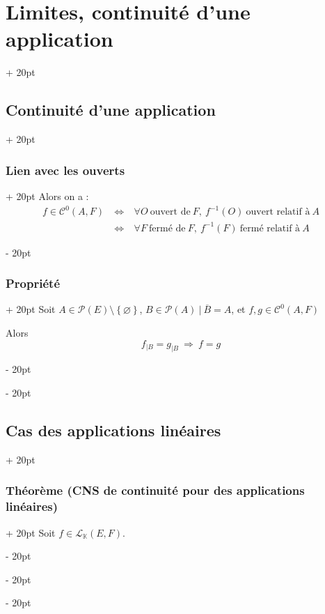 \documentclass[a4paper, 12pt, twoside]{article}
\newcommand{\K}{\mathbb K}
\newcommand{\cj}[1]{\overline{#1}} %
\newcommand{\set}[1]{\left\{ #1 \right\}}
\newcommand{\ssi}{\ \Leftrightarrow \ }
\newcommand{\ind}[1][20pt]{\advance\leftskip + #1}
\newcommand{\deind}[1][20pt]{\advance\leftskip - #1}
\newenvironment{indt}[2][20pt]{#2 \par \ind[#1]}{\par \deind} %
\begin{document}
\begin{indt}{\section{Limites, continuité d'une application}}
\begin{indt}{\subsection{Continuité d'une application}}
\begin{indt}{\subsubsection{Lien avec les ouverts}}
                Alors on a :
                \[
                    \begin{array}{rcl}
                        f \in \mathcal C^0(A, F)
                        &\ssi&
                        \forall O\ \text{ouvert de}\ F,\
                        f^{-1}(O)\ \text{ouvert relatif à}\ A
                        \\
                        &\ssi&
                        \forall F\ \text{fermé de}\ F,\
                        f^{-1}(F)\ \text{fermé relatif à}\ A
                    \end{array}
                \]
            \end{indt}

            \vspace{12pt}
            
            \begin{indt}{\subsubsection{Propriété}}
                Soit $A \in \mathcal P(E) \setminus \set \varnothing$, $B \in \mathcal P(A)\ |\ \cj B = A$, et $f, g \in \mathcal C^0(A, F)$

                Alors
                \[
                    f_{|B} = g_{|B}\
                    \Rightarrow\
                    f = g
                \]
            \end{indt}
        \end{indt}

        \vspace{12pt}
        
        \begin{indt}{\subsection{Cas des applications linéaires}}
            \begin{indt}{\subsubsection{Théorème (CNS de continuité pour des applications linéaires)}}
                Soit $f \in \mathcal L_\K(E, F)$.


\end{indt}
\end{indt}
\end{indt}
\end{document}
